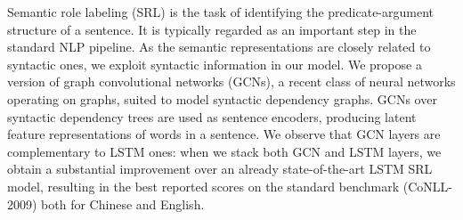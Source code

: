 Semantic role labeling (SRL) is the task of identifying the predicate-argument structure of a sentence. It is typically regarded as an important step in the standard NLP pipeline. As the semantic representations are closely related to syntactic ones, we exploit syntactic information in our model. We propose a version of graph convolutional networks (GCNs), a recent class of neural networks operating on graphs, suited to model syntactic dependency graphs. GCNs over syntactic dependency trees are used as sentence encoders, producing latent feature representations of words in a sentence. We observe that GCN layers are complementary to LSTM ones: when we stack both GCN and LSTM layers, we obtain a substantial improvement over an already state-of-the-art LSTM SRL model, resulting in the best reported scores on the standard benchmark (CoNLL-2009) both for Chinese and English.
